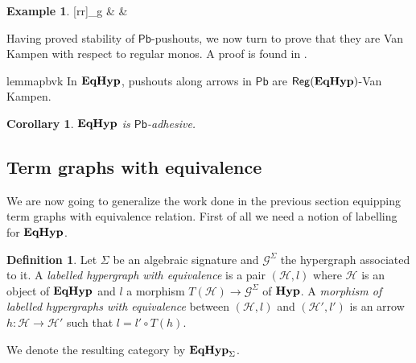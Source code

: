 \documentclass[a4paper,UKenglish,cleveref,pdftex,amsthm,thm-restate,numberwithinsect]{cas-sc}
\newcommand{\pbc}{\mathsf{Pb}}
\theoremstyle{plain}
\newtheorem{corollary}[theorem]{Corollary}
\theoremstyle{definition}
\newtheorem{definition}[theorem]{Definition}
\newtheorem{example}[theorem]{Example}
\newcommand{\catname}[1]{\textbf{\textup{#1}}}
\newcommand{\hyp}{\catname{Hyp}}
\newcommand{\EqHyp}{\catname{EqHyp}} %
\newcommand{\reg}{\mathsf{Reg}}
\begin{document}
\begin{example}
\begin{minipage}[r]{.60\linewidth}
{                \ar@{>->}[rr]_{g} & & 
                 }
  \end{minipage}
\end{example}


Having proved stability of $\pbc$-pushouts, we now turn to prove that they are Van Kampen with respect to regular monos.
%
A proof is found in .

\begin{restatable}{lemma}{pbvk}\label{lemma:van_kampen}
	In $\EqHyp$, pushouts along arrows in $\pbc$ are $\reg(\EqHyp)$-Van Kampen.
\end{restatable}

\begin{corollary}\label{cor:eqade}
	$\EqHyp$ is $\pbc$-adhesive.
\end{corollary}

%
%

\subsection{Term graphs with equivalence}


We are now going to generalize the work done in the previous section equipping term graphs with equivalence relation. First of all we need a notion of labelling for $\EqHyp$. 

\begin{definition}
	Let $\Sigma$ be an algebraic signature and $\mathcal{G}^{\Sigma}$ the hypergraph associated to it. A \emph{labelled hypergraph with equivalence} is a pair $(\mathcal{H}, l)$ where $\mathcal{H}$ is an object of $\EqHyp$ and $l$ a morphism $T(\mathcal{H})\to \mathcal{G}^\Sigma$ of $\hyp$. A \emph{morphism of labelled hypergraphs with equivalence} between $(\mathcal{H}, l)$ and $(\mathcal{H}', l')$ is an arrow $h\colon \mathcal{H}\to \mathcal{H}'$ such that $l= l'\circ T(h)$.
	
	We denote the resulting category by $\EqHyp_\Sigma$.
\end{definition}
\end{document}
